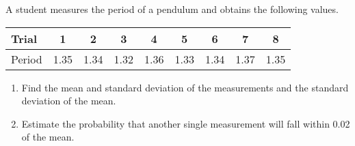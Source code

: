\item[4.5] A student measures the period of a pendulum and obtains the following
  values.
%
  \begin{tabular}{l | c c c c c c c c}
    Trial  & 1    & 2    & 3    & 4    & 5    & 6    & 7    & 8    \\
    \hline
    Period & 1.35 & 1.34 & 1.32 & 1.36 & 1.33 & 1.34 & 1.37 & 1.35
  \end{tabular}
%
  \begin{enumerate}[label=(\alph*)]
    \item Find the mean and standard deviation of the measurements and the
      standard deviation of the mean.
    \item Estimate the probability that another single measurement will fall
      within 0.02 of the mean.
   \end{enumerate}